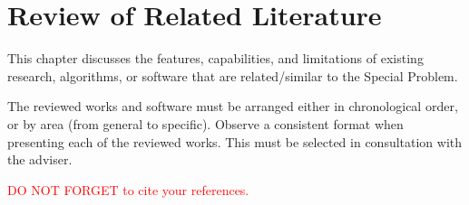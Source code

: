 \chapter{Review of Related Literature}
\label{sec:relatedlit}

This chapter discusses the features, capabilities, and limitations of existing research, algorithms, or software  that are related/similar to the Special Problem.

 The reviewed works and software must be arranged either in chronological order, or by area (from general to specific).  
Observe a consistent format when presenting each of the reviewed works. 
This must be selected in consultation with the  adviser.

\textcolor{red}{DO NOT FORGET to cite your references.}


\begin{comment}
%
%
Guide on Writing your RRL chapter
 
1. Identify the keywords with respect to your research
      One keyword = One document section
                Examples: 2.1 Story Generation Systems
			 2.2 Knowledge Representation

2.  Find references using these keywords

3.  For each of the references that you find,
        Check: Is it relevant to your research?
        Use their references to find more relevant works.

4. Identify a set of criteria for comparison.
       It will serve as a guide to help you focus on what to look for

5. Write a summary focusing on -
       What: A short description of the work
       How: A summary of the approach it utilized
       Findings: If applicable, provide the results
        Why: Relevance to your work

6. At the end of each section,  show a Table of Comparison of the related works 
   and your proposed project/system

\end{comment}

